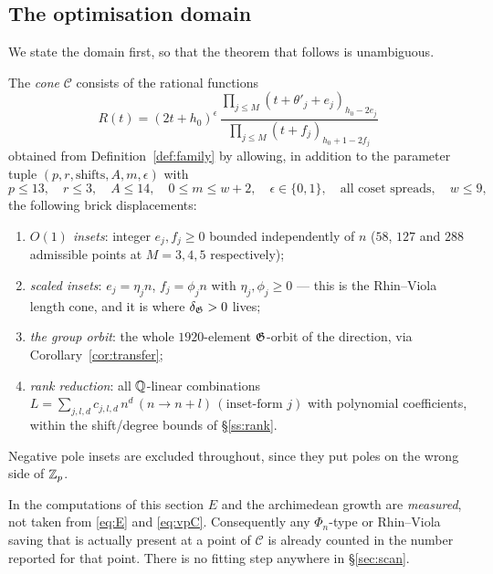 \subsection{The optimisation domain}\label{ss:optdomain}

We state the domain first, so that the theorem that follows is unambiguous.

\begin{definition}\label{def:cone}
The \emph{cone} $\mathcal C$ consists of the rational functions
\begin{equation}\label{eq:conefam}
 R(t)=(2t+h_0)^{\epsilon}\,
 \frac{\prod_{j\le M}(t+\theta'_j+e_j)_{h_0-2e_j}}{\prod_{j\le M}(t+f_j)_{h_0+1-2f_j}}
\end{equation}
obtained from Definition~\ref{def:family} by allowing, in addition to the parameter tuple
$(p,r,\text{shifts},A,m,\epsilon)$ with
\[
 p\le13,\quad r\le3,\quad A\le14,\quad 0\le m\le w+2,\quad \epsilon\in\{0,1\},
 \quad\text{all coset spreads},\quad w\le9,
\]
the following brick displacements:
\begin{enumerate}[label=\textup{(\alph*)},leftmargin=2.6em,itemsep=2pt]
\item \emph{$O(1)$ insets}: integer $e_j,f_j\ge0$ bounded independently of $n$ ($58$, $127$
      and $288$ admissible points at $M=3,4,5$ respectively);
\item \emph{scaled insets}: $e_j=\eta_jn$, $f_j=\phi_jn$ with $\eta_j,\phi_j\ge0$ --- this is
      the Rhin--Viola length cone, and it is where $\delta_{\mathfrak{G}}>0$ lives;
\item \emph{the group orbit}: the whole $1920$-element $\mathfrak{G}$-orbit of the direction, via
      Corollary~\ref{cor:transfer};
\item \emph{rank reduction}: all $\mathbb{Q}$-linear combinations
      $L=\sum_{j,l,d}c_{j,l,d}\,n^d\,(n\to n+l)\,(\text{inset-form }j)$ with polynomial
      coefficients, within the shift/degree bounds of \S\ref{ss:rank}.
\end{enumerate}
Negative pole insets are excluded throughout, since they put poles on the wrong side of
$\mathbb{Z}_p$.
\end{definition}

\begin{remark}\label{rem:nocalib}
In the computations of this section $E$ and the archimedean growth are \emph{measured}, not
taken from \eqref{eq:E} and \eqref{eq:vpC}. Consequently any $\Phi_n$-type or Rhin--Viola
saving that is actually present at a point of $\mathcal C$ is already counted in the number
reported for that point. There is no fitting step anywhere in \S\ref{sec:scan}.
\end{remark}

